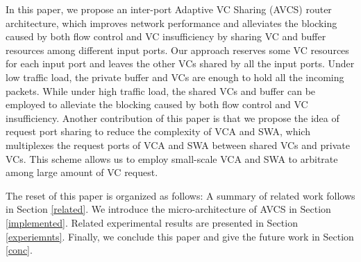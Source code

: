 \documentclass[10pt,conference]{IEEEtran}
\begin{document}

In this paper, we propose an inter-port Adaptive VC Sharing (AVCS) router architecture, which improves network performance and alleviates the blocking caused by both flow control and VC insufficiency by sharing VC and buffer resources among different input ports. Our approach reserves some VC resources for each input port and leaves the other VCs shared by all the input ports. Under low traffic load, the private buffer and VCs are enough to hold all the incoming packets. While under high traffic load, the shared VCs and buffer can be employed to alleviate the blocking caused by both flow control and VC insufficiency. Another contribution of this paper is that we propose the idea of request port sharing to reduce the complexity of VCA and SWA, which multiplexes the request ports of VCA and SWA between shared VCs and private VCs. This scheme allows us to employ small-scale VCA and SWA to arbitrate among large amount of VC request.

The reset of this paper is organized as follows: A summary of related work follows in Section \ref{related}. We introduce the micro-architecture of AVCS in Section \ref{implemented}. Related experimental results are presented in Section \ref{experiemnts}. Finally, we conclude this paper and give the future work in Section \ref{conc}.

\end{document}
